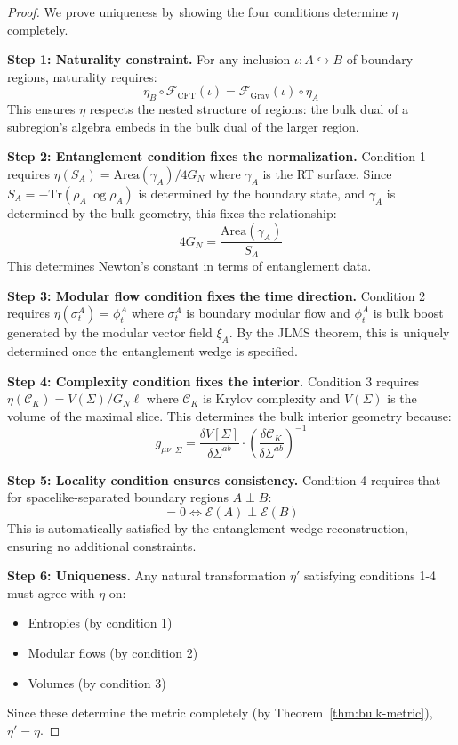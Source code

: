 \documentclass[12pt,a4paper]{article}
\begin{document}
\begin{proof}
We prove uniqueness by showing the four conditions determine $\eta$ completely.

\textbf{Step 1: Naturality constraint.}
For any inclusion $\iota: A \hookrightarrow B$ of boundary regions, naturality requires:
\begin{equation}
\eta_B \circ \mathcal{F}_{\text{CFT}}(\iota) = \mathcal{F}_{\text{Grav}}(\iota) \circ \eta_A
\end{equation}
This ensures $\eta$ respects the nested structure of regions: the bulk dual of a subregion's algebra embeds in the bulk dual of the larger region.

\textbf{Step 2: Entanglement condition fixes the normalization.}
Condition 1 requires $\eta(S_A) = \text{Area}(\gamma_A)/4G_N$ where $\gamma_A$ is the RT surface. Since $S_A = -\text{Tr}(\rho_A \log \rho_A)$ is determined by the boundary state, and $\gamma_A$ is determined by the bulk geometry, this fixes the relationship:
\begin{equation}
4G_N = \frac{\text{Area}(\gamma_A)}{S_A}
\end{equation}
This determines Newton's constant in terms of entanglement data.

\textbf{Step 3: Modular flow condition fixes the time direction.}
Condition 2 requires $\eta(\sigma_t^A) = \phi_t^A$ where $\sigma_t^A$ is boundary modular flow and $\phi_t^A$ is bulk boost generated by the modular vector field $\xi_A$. By the JLMS theorem, this is uniquely determined once the entanglement wedge is specified.

\textbf{Step 4: Complexity condition fixes the interior.}
Condition 3 requires $\eta(\mathcal{C}_K) = V(\Sigma)/G_N\ell$ where $\mathcal{C}_K$ is Krylov complexity and $V(\Sigma)$ is the volume of the maximal slice. This determines the bulk interior geometry because:
\begin{equation}
g_{\mu\nu}|_{\Sigma} = \frac{\delta V[\Sigma]}{\delta \Sigma^{ab}} \cdot \left(\frac{\delta \mathcal{C}_K}{\delta \Sigma^{ab}}\right)^{-1}
\end{equation}

\textbf{Step 5: Locality condition ensures consistency.}
Condition 4 requires that for spacelike-separated boundary regions $A \perp B$:
\begin{equation}
[\eta(\mathcal{A}(A)), \eta(\mathcal{A}(B))] = 0 \Leftrightarrow \mathcal{E}(A) \perp \mathcal{E}(B)
\end{equation}
This is automatically satisfied by the entanglement wedge reconstruction, ensuring no additional constraints.

\textbf{Step 6: Uniqueness.}
Any natural transformation $\eta'$ satisfying conditions 1-4 must agree with $\eta$ on:
\begin{itemize}
    \item Entropies (by condition 1)
    \item Modular flows (by condition 2)  
    \item Volumes (by condition 3)
\end{itemize}
Since these determine the metric completely (by Theorem~\ref{thm:bulk-metric}), $\eta' = \eta$.
\end{proof}
\end{document}
